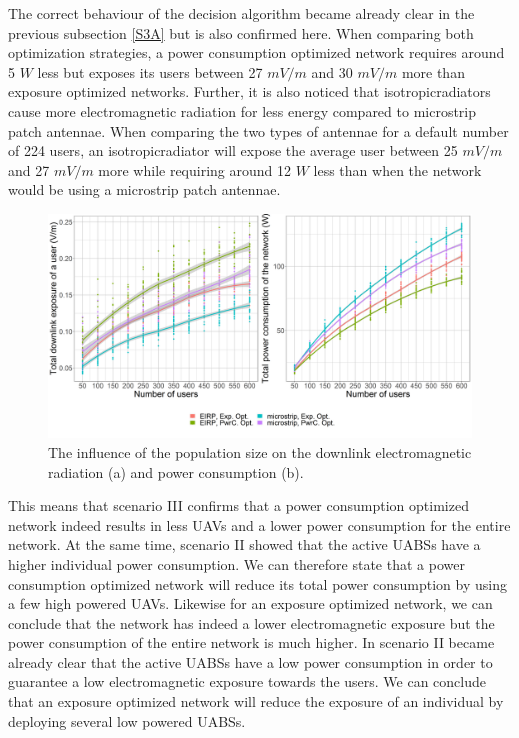 The correct behaviour of the decision algorithm became already clear in the previous subsection \ref{S3A} but is also
confirmed here. 
When comparing both optimization strategies, a power consumption optimized network requires around 5 $W$ less but exposes its users between 27 $mV/m$ and 30 $mV/m$ more than
exposure optimized networks. 
Further, it is also noticed that \gls{isotropicradiator}s cause more electromagnetic radiation for less energy
compared to microstrip patch antennae. 
When comparing the two types of antennae for a default number of 224 users, 
an \gls{isotropicradiator} will expose the average user 
between 25 $mV/m$ and 27 $mV/m$ more while requiring around 12 $W$ less than when the network would be using a microstrip patch antennae.


\begin{figure}[h!]
  \includegraphics[width=\textwidth]{../results/s3/uvsdlAndPc.png}
  \caption{The influence of the population size on the downlink electromagnetic radiation (a) and power consumption (b).}
  \label{fig:s3b_dlAndPC}
\end{figure}


This means that scenario III confirms that a power consumption optimized network indeed results in less \gls{UAV}s and a lower 
 power consumption for the entire network. 
At the same time, scenario II showed that the active \gls{UABS}s have a higher individual power consumption.
We can therefore state that a power consumption optimized network will reduce its total power consumption by
using a few high powered \gls{UAV}s.
Likewise for an exposure optimized network, we can conclude that the network has indeed a lower electromagnetic exposure but the power consumption 
of the entire network is much higher. In scenario II became already clear that the active \gls{UABS}s have a low power consumption in order to 
guarantee a low electromagnetic exposure towards the users.
We can conclude that an exposure optimized network will reduce the exposure of an individual 
by deploying several low powered \gls{UABS}s.

